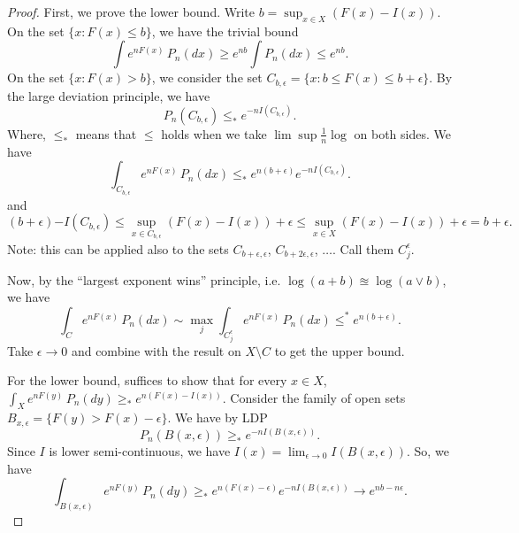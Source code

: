 \begin{proof}
    First, we prove the lower bound.
    Write $b = \sup_{x \in X} \left( F(x) - I(x) \right)$. On the set $\{ x: F(x) \leq b \}$, we have the trivial bound
    \[
        \int e^{nF(x)} \, P_n(dx) \geq e^{nb} \int P_n(dx) \leq e^{nb}
    .\]
    On the set $\{ x: F(x) > b \}$, we consider the set $C_{b, \epsilon}= \{x: b \leq F(x) \leq b + \epsilon \}$. By the large deviation principle, we have
    \[
        P_n(C_{b, \epsilon}) \leq_* e^{-nI(C_{b, \epsilon})} 
    .\]
    Where, $\leq_*$ means that $\leq$ holds when we take $\lim\sup \frac{1}{n} \log$ on both sides. We have
    \[
        \int_{C_{b, \epsilon}} e^{nF(x)} \, P_n(dx) 
        \leq_* e^{n(b + \epsilon)} e^{-nI(C_{b, \epsilon})} 
    .\]
    and
    \[
        {(b + \epsilon)} {-I(C_{b, \epsilon})} 
        \leq \sup_{x \in C_{b, \epsilon}} \left( F(x) - I(x) \right) + \epsilon
        \leq \sup_{x \in X} \left( F(x) - I(x) \right) + \epsilon
        = b + \epsilon 
    .\]
    Note: this can be applied also to the sets $C_{b + \epsilon, \epsilon}$, $C_{b + 2\epsilon, \epsilon}$, $\ldots$. Call them $C_j^\epsilon$.

    Now, by the ``largest exponent wins'' principle, i.e. $\log(a + b) \approxeq \log(a \vee b)$, we have
    \[
        \int_C e^{nF(x)} \, P_n(dx)
        \sim
        \max_{j} \int_{C_j^\epsilon} e^{nF(x)} \, P_n(dx)
        \leq^* e^{n(b + \epsilon)} 
    .\]
    Take $\epsilon \to 0$ and combine with the result on $X \setminus C$ to get the upper bound.

    For the lower bound, suffices to show that for every $x \in X$, $\int_X e^{nF(y)} \, P_n(dy) \geq_* e^{n(F(x) - I(x))}$. Consider the family of open sets $B_{x, \epsilon} = \{F(y) > F(x) - \epsilon\}$. We have by LDP
    \[
        P_n(B(x, \epsilon)) \geq_* e^{-nI(B(x, \epsilon))}
    .\]
    Since $I$ is lower semi-continuous, we have $I(x) = \lim_{\epsilon \to 0} I(B(x, \epsilon))$. So, we have
    \[
        \int_{B(x, \epsilon)} e^{nF(y)} \, P_n(dy) \geq_* e^{n(F(x) - \epsilon)} e^{-nI(B(x, \epsilon))} \to e^{nb - n \epsilon}
    .\]


\end{proof}

